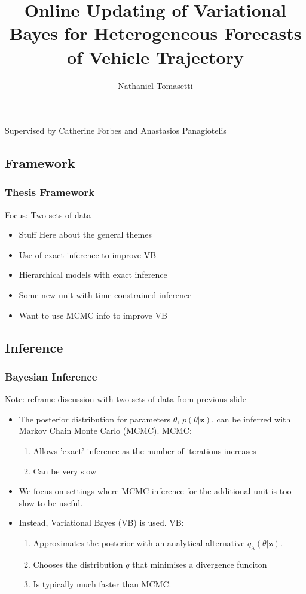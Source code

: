 \documentclass[8pt]{beamer}\usepackage[]{graphicx}\usepackage[]{color}
\title[Online Updating of Variational Bayes]{Online Updating of Variational Bayes for Heterogeneous Forecasts of Vehicle Trajectory}
\author[Nathaniel Tomasetti]{Nathaniel Tomasetti}
\date{ }
\begin{document}
\begin{frame}
\titlepage
\centering
Supervised by Catherine Forbes and Anastasios Panagiotelis
\end{frame}


\begin{frame}
\tableofcontents
\end{frame}

\begin{frame}
\section{Framework}
\frametitle{Thesis Framework}
Focus: Two sets of data
\begin{itemize}
\item Stuff Here about the general themes
\item Use of exact inference to improve VB
\item Hierarchical models with exact inference
\item Some new unit with time constrained inference
\item Want to use MCMC info to improve VB
\end{itemize}
\end{frame}


\begin{frame}
\section{Inference}
\frametitle{Bayesian Inference}
Note: reframe discussion with two sets of data from previous slide
\begin{itemize}
\item The posterior distribution for parameters $\theta$, $p(\theta | \textbf{z})$, can be inferred with Markov Chain Monte Carlo (MCMC). MCMC:
\begin{enumerate}
\item Allows 'exact' inference as the number of iterations increases
\item Can be very slow
\end{enumerate}
\item We focus on settings where MCMC inference for the additional unit is too slow to be useful.
\item Instead, Variational Bayes (VB) is used. VB:
\begin{enumerate}
\item Approximates the posterior with an analytical alternative $q_{\lambda}(\theta | \textbf{z})$.
\item Chooses the distribution $q$ that minimises a divergence funciton
\item Is typically much faster than MCMC.
\end{enumerate}
\end{itemize}
\end{frame}
\end{document}
